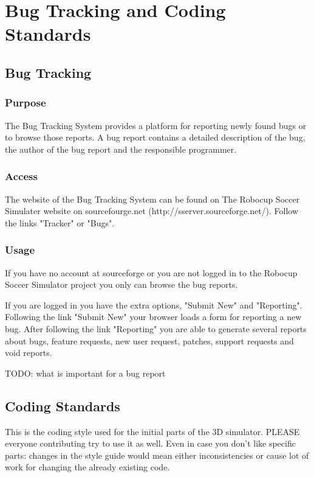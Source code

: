 
\chapter{Bug Tracking and Coding Standards}


\section{Bug Tracking}

\subsection{Purpose}

The Bug Tracking System provides a platform for reporting newly found bugs or to
browse those reports. A bug report contains a detailed description of the bug, 
the author of the bug report and the responsible programmer.

\subsection{Access}

The website of the Bug Tracking System can be found on 
The Robocup Soccer Simulater website on sourcefourge.net 
(http://sserver.sourceforge.net/). Follow the links "Tracker" or "Bugs".

\subsection{Usage}

If you have no account at sourceforge or you are not logged in 
to the Robocup Soccer Simulator project
you only can browse the bug reports.

If you are logged in you have the extra options, "Submit New" and "Reporting".
Following the link "Submit New" your browser loads a form for reporting a new bug.
After following the link "Reporting" you are able to generate several reports about
bugs, feature requests, new user request, patches, support requests and void reports.

TODO: what is important for a bug report

\section{Coding Standards}

This is the coding style used for the initial parts of the 3D simulator. 
PLEASE everyone contributing try to use it as well. 
Even in case you don't like specific parts: changes in the style guide would mean 
either inconsistencies or cause lot of work for changing the already existing code. 


